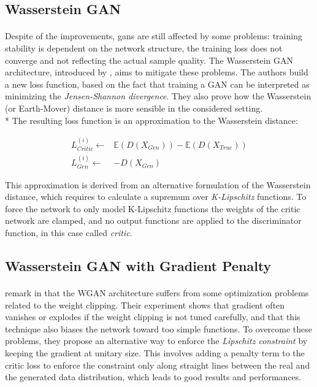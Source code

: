 \subsection{Wasserstein GAN}
\paragraph{} Despite of the improvements, \glspl{gan} are still affected by some problems: training stability is dependent on the network structure, the training loss does not converge and not reflecting the actual sample quality. The Wasserstein GAN architecture, introduced by \citeauthor{wgan} \cite{wgan}, aims to mitigate these problems. The authors build a new loss function, based on the fact that training a GAN can be interpreted as minimizing the \textit{Jensen-Shannon divergence}\cite{jsdivergence}. They also prove how the Wasserstein (or Earth-Mover) \cite[\S~3]{wgan} distance is more sensible in the considered setting. \\* The resulting loss function is an approximation to the Wasserstein distance:

\begin{equation}
\label{eq:wganloss}
\begin{split}
L_{Critic}^{(i)} \gets & \mathbb{E}(D(X_{Gen})) - \mathbb{E}(D(X_{True}))\\
L_{Gen}^{(i)} \gets & -D(X_{Gen}) 
\end{split}
\end{equation}

This approximation is derived from an alternative formulation of the Wasserstein distance, which requires to calculate a supremum over \textit{K-Lipschitz} functions. To force the network to only model K-Lipschitz functions the weights of the critic network are clamped, and no output functions are applied to the discriminator function, in this case called \textit{critic}.  

\subsection{Wasserstein GAN with Gradient Penalty}
\label{sec:wgangp}
\paragraph{} \citeauthor{wgangp} remark in \cite{wgangp} that the WGAN architecture suffers from some optimization problems related to the weight clipping. Their experiment shows that gradient often vanishes or explodes if the weight clipping is not tuned carefully, and that this technique also biases the network toward too simple functions. To overcome these problems, they propose an alternative way to enforce the \textit{Lipschitz constraint} by keeping the gradient at unitary size. This involves adding a penalty term to the critic loss to enforce the constraint only along straight lines between the real and the generated data distribution, which leads to good results and performances.

